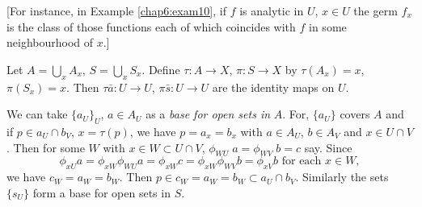 [For instance, in Example \ref{chap6:exam10}, if $f$ is analytic in
  $U$, $x \in U$ 
  the germ $f_x$ is the class of those functions each of which
  coincides with $f$ in some neighbourhood of $x$.] 

Let $A= \bigcup_x A_x$,  $S = \bigcup_x S_x$. Define $\tau : A \to X$,
$\pi: S \to X$ by $\tau (A_x) = x$, $\pi (S_x)=x$. Then $\tau \bar{a}:
U \to U$, $\pi \bar{s}: U \to U$ are the identity maps on $U$. 

We can take $\{a_U \}_ U$, $a \in A_U$ as a \textit{base for open sets
  in} $A$. For, $\{a_U\}$ covers $A$ and if $p \in a_U \cap b_V$,  $x
=\tau (p)$, we have $p=a_x =b_x$ with $a \in A_U$, $b \in A_V$ and $x
\in U \cap V$. Then for some $W$ with $x \in W \subset U \cap
V$, $\phi_{WU} \; a = \phi_{WV} \;b=c$ say. Since 
$$
\phi_{xU} a = \phi_{xW} \phi_{WU}a = \phi_{xW} c = \phi_{xW} \phi_{WV}
b= \phi_{xV}b \text{ for each } x \in W,    
$$
we have $c_W= a_W = b_W$. Then $p \in c_W = a_W = b_W \subset a_U \cap
b_V$. Similarly the sets $\{s_U\}$ form a base for open sets in $S$. 



